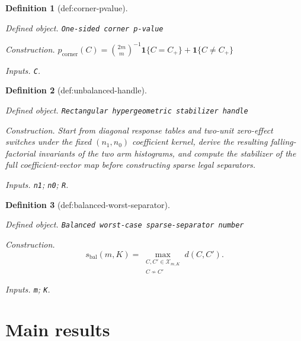 \documentclass{article}
\newtheorem{definition}{Definition}
\begin{document}
\begin{definition}[def:corner-pvalue]\label{def:corner-pvalue}
\par\smallskip\noindent\emph{Defined object.} \texttt{One-\allowbreak{}sided corner p-\allowbreak{}value}
\par\smallskip\noindent\emph{Construction.} \(p_{\mathrm{corner}}(C)=\binom{2m}{m}^{-1}\mathbf 1\{C=C_+\}+\mathbf 1\{C\neq C_+\}\)
\par\smallskip\noindent\emph{Inputs.} \texttt{C}.
\end{definition}

\begin{definition}[def:unbalanced-handle]\label{def:unbalanced-handle}
\par\smallskip\noindent\emph{Defined object.} \texttt{Rectangular hypergeometric stabilizer handle}
\par\smallskip\noindent\emph{Construction.} Start from diagonal response tables and two-unit zero-effect switches under the fixed \((n_1,n_0)\) coefficient kernel, derive the resulting falling-factorial invariants of the two arm histograms, and compute the stabilizer of the full coefficient-vector map before constructing sparse legal separators.
\par\smallskip\noindent\emph{Inputs.} \texttt{n1}; \texttt{n0}; \texttt{R}.
\end{definition}

\begin{definition}[def:balanced-worst-separator]\label{def:balanced-worst-separator}
\par\smallskip\noindent\emph{Defined object.} \texttt{Balanced worst-\allowbreak{}case sparse-\allowbreak{}separator number}
\par\smallskip\noindent\emph{Construction.} \[
s_{\mathrm{bal}}(m,K)
=
\max_{\substack{C,C'\in\mathcal X_{m,K}\\ C\not\sim C'}}
d(C,C').
\]
\par\smallskip\noindent\emph{Inputs.} \texttt{m}; \texttt{K}.
\end{definition}

\section{Main results}
\end{document}
